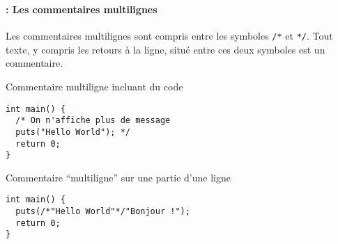 \begin{frame}[containsverbatim]
  \frametitle{\secname}
  \framesubtitle{\subsecname : Les commentaires multilignes}
  
  {Les commentaires multilignes sont compris entre les symboles \verb|/*| et \verb|*/|. 
  Tout texte, y compris les retours à la ligne, situé entre ces deux symboles est un commentaire.}
  \begin{exampleblock}{Commentaire multiligne incluant du code}
    \small\begin{verbatim}
int main() {
  /* On n'affiche plus de message
  puts("Hello World"); */
  return 0;
}\end{verbatim}
  \end{exampleblock}
  \begin{exampleblock}{Commentaire ``multiligne'' sur une partie d'une ligne}
    \small\begin{verbatim}
int main() {
  puts(/*"Hello World"*/"Bonjour !");
  return 0;
}\end{verbatim}
  \end{exampleblock}
\end{frame}

